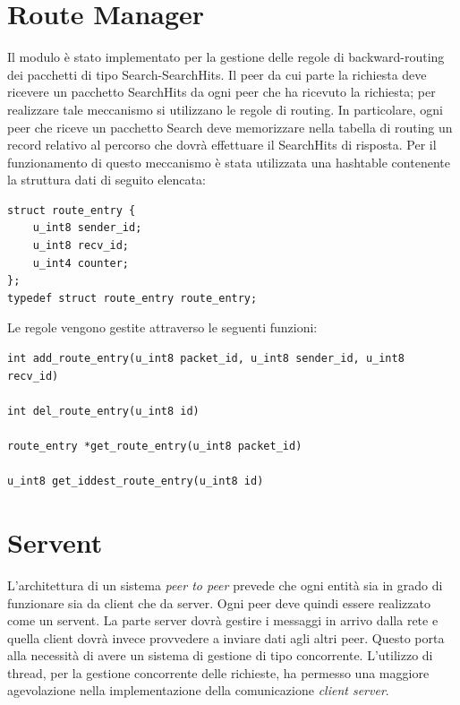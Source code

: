 \section{Route Manager}
Il modulo è stato implementato per la gestione delle regole di backward-routing dei pacchetti di tipo Search-SearchHits. Il peer da cui parte la richiesta deve ricevere un pacchetto SearchHits da ogni peer che ha ricevuto la richiesta; per realizzare tale meccanismo si utilizzano le regole di routing. In particolare, ogni peer che riceve un pacchetto Search deve memorizzare nella tabella di routing un record relativo al percorso che dovrà effettuare il SearchHits di risposta.
Per il funzionamento di questo meccanismo è stata utilizzata una hashtable contenente la struttura dati di seguito elencata:
\begin{lstlisting}[frame=trBL]
struct route_entry {
	u_int8 sender_id;
	u_int8 recv_id;
	u_int4 counter;
};
typedef struct route_entry route_entry;
\end{lstlisting}
Le regole vengono gestite attraverso le seguenti funzioni:
\begin{lstlisting}[frame=trBL]
int add_route_entry(u_int8 packet_id, u_int8 sender_id, u_int8 recv_id)

int del_route_entry(u_int8 id)

route_entry *get_route_entry(u_int8 packet_id)

u_int8 get_iddest_route_entry(u_int8 id)
\end{lstlisting}
\section{Servent}
L’architettura di un sistema \textit{peer to peer} prevede che ogni entità sia in grado di funzionare sia da client che da server. Ogni peer deve quindi essere realizzato come un servent. La parte server dovrà gestire i messaggi in arrivo dalla rete e quella client dovrà invece provvedere a inviare dati agli altri peer. Questo porta alla necessità di avere un sistema di gestione di tipo concorrente. L'utilizzo di thread, per la gestione concorrente delle richieste, 
ha permesso una maggiore agevolazione nella implementazione della comunicazione \textit{client server}.
